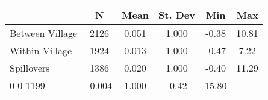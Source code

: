 \begin{tabular}{l*{5}{c}}\hline&\multicolumn{1}{c}{N}&\multicolumn{1}{c}{Mean}&\multicolumn{1}{c}{St. Dev}&\multicolumn{1}{c}{Min}&\multicolumn{1}{c}{Max}\\ \hline 
Between Village & 2126 & 0.051 & 1.000 & -0.38 & 10.81 \\
Within Village & 1924 & 0.013 & 1.000 & -0.47 & 7.22 \\
Spillovers & 1386 & 0.020 & 1.000 & -0.40 & 11.29 \\
0 0 1199 & -0.004 & 1.000 & -0.42 & 15.80 \\
\hline \end{tabular}
